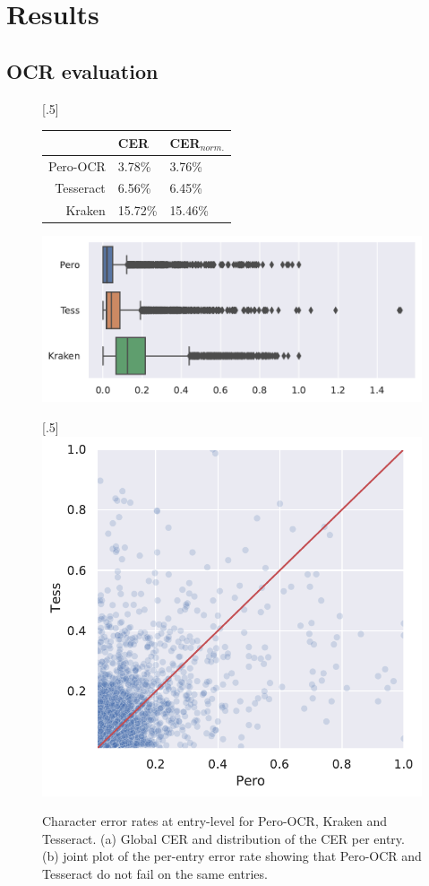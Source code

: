 \section{Results}

\subsection{OCR evaluation}

\begin{figure}

\subcaptionbox{}[.5\linewidth]{
\begin{tabular}{rll}
\toprule
          & CER & CER$_{norm.}$ \\
\midrule
Pero-OCR  & 3.78\% & 3.76\% \\   
Tesseract & 6.56\% & 6.45\% \\
Kraken    & 15.72\% & 15.46\% \\  
\bottomrule
\end{tabular}

\bigskip

\includegraphics[width=\linewidth]{images/ocr-eval-2.pdf}
}
\subcaptionbox{}[.5\linewidth]{
\includegraphics[width=\linewidth]{images/ocr-eval-1.pdf}
}
\caption{Character error rates at entry-level for Pero-OCR, Kraken and Tesseract. (a) Global CER and distribution of the CER per entry. (b)
joint plot of the per-entry error rate showing that Pero-OCR and Tesseract do not fail on the same entries.}  
\label{fig.ocr-results}
\end{figure}

